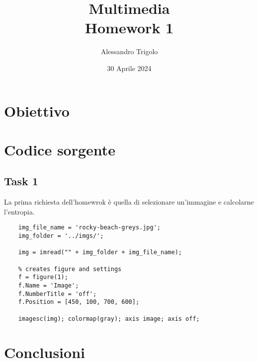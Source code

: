 \title{\vspace{160px} \textbf{\huge{Multimedia}} \\\vspace{17.5px} \LARGE{Homework 1}  \vspace{10px}}
\author{Alessandro Trigolo}
\date{30 Aprile 2024}



\maketitle\newpage




\section{Obiettivo}



\section{Codice sorgente}

\subsection*{Task 1}

La prima richiesta dell'homewrok è quella di selezionare un'immagine e calcolarne l'entropia. 

\begin{lstlisting}
    img_file_name = 'rocky-beach-greys.jpg';
    img_folder = '../imgs/';
    
    img = imread("" + img_folder + img_file_name);
    
    % creates figure and settings
    f = figure(1);
    f.Name = 'Image';
    f.NumberTitle = 'off';
    f.Position = [450, 100, 700, 600];
    
    imagesc(img); colormap(gray); axis image; axis off; 
\end{lstlisting}




\section{Conclusioni}


